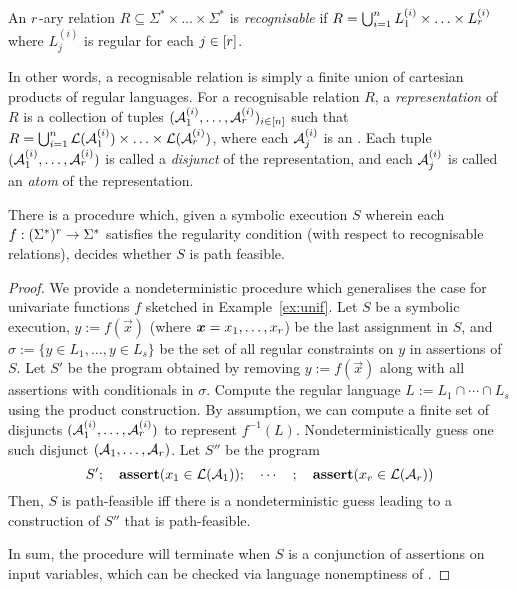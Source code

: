 \begin{definition}
    An $r$-ary relation $R\subseteq \Sigma^*\times \ldots\times \Sigma^*$ is \emph{recognisable}  if $R=\bigcup_{i=1}^n L^{(i)}_1\times \ldots\times L^{(i)}_r$ where $L^{(i)}_j$ is regular for each $j\in [r]$.
%
\end{definition}
In other words, a recognisable relation is simply a finite union of 
cartesian products of regular languages. 
For a recognisable relation $R$, a \emph{representation} of $R$ is a collection of tuples $(\mathcal{A}^{(i)}_1, \ldots, \mathcal{A}^{(i)}_r)_{i\in [n]}$  such that 
$R = \bigcup_{i=1}^n \mathcal{L}(\mathcal{A}^{(i)}_1) \times \ldots\times \mathcal{L}(\mathcal{A}^{(i)}_r)$, where each $\mathcal{A}^{(i)}_j$ is an \FA. 
Each tuple $(\mathcal{A}^{(i)}_1, \ldots, \mathcal{A}^{(i)}_r)$ is called a \emph{disjunct} of the representation, and  each \FA{} $\mathcal{A}^{(i)}_j$ is called an \emph{atom} of the representation.
%
\begin{theorem}
    There is a procedure which, given a symbolic execution $S$ wherein 
    each $f: (\Sigma^*)^r \to \Sigma^*$ satisfies the regularity 
    condition (with respect to recognisable relations), decides whether $S$
    is path feasible.
    \label{th:gen}
\end{theorem}
%
\begin{proof}
    We provide a nondeterministic procedure which generalises the case for
    univariate functions $f$ sketched in Example~\ref{ex:unif}. Let $S$  be a symbolic execution, $y := f(\vec{x})$ (where
    $\vec{x} = x_1,\ldots,x_\arity$) be the last
    assignment in $S$, and $\sigma := \{ y \in L_1,\ldots, y \in L_s\}$
    be the set of all regular constraints on $y$ in assertions of $S$.
    Let $S'$ be the program obtained by removing $y := f(\vec{x})$ along
    with all assertions with conditionals in $\sigma$.
    Compute the regular language $L := L_1 \cap \cdots \cap L_s$ using
    the product construction. By 
    assumption, we can compute a finite set of disjuncts
    $(\mathcal{A}^{(i)}_1, \ldots, \mathcal{A}^{(i)}_r)$  to represent
    $f^{-1}(L)$. Nondeterministically guess one such disjunct
    $(\mathcal{A}_1, \ldots, \mathcal{A}_r)$. Let $S''$ be the program 
    \[
        S'; \quad \textbf{assert}(x_1 \in \mathcal{L}(\mathcal{A}_1)); \quad \cdots\quad ; \quad \textbf{assert}(x_r \in
        \mathcal{L}(\mathcal{A}_r))
    \]
    Then, $S$ is path-feasible iff there is a nondeterministic guess leading
    to a construction of $S''$ that is path-feasible. 

    In sum, the procedure will terminate when $S$ is a conjunction of
    assertions on input variables, which can be
    checked via language nonemptiness of \FA{}.
\end{proof}
